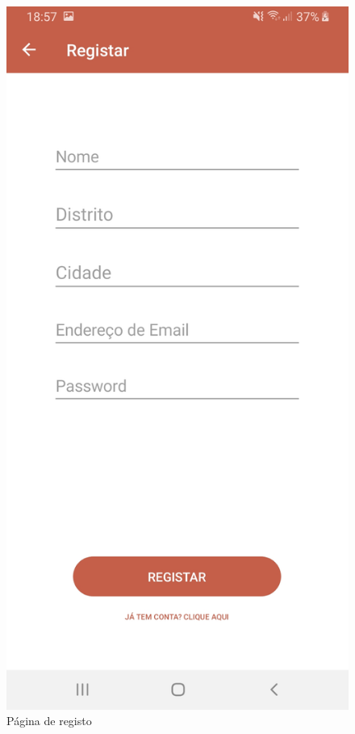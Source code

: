 \begin{figure}[H]
\centering
\includegraphics[width=0.5\linewidth]{images/registar.jpg}
\caption{Página de registo}
\end{figure}